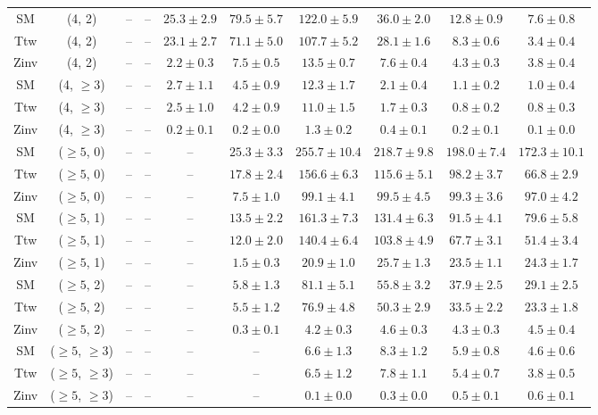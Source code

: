 \begin{table}[h!]
{\begin{tabular}{cccccccccc}
	SM & (4, 2) & -- & -- & $25.3\pm 2.9$ & $79.5\pm 5.7$ & $122.0\pm 5.9$ & $36.0\pm 2.0$ & $12.8\pm 0.9$ & $7.6\pm 0.8$ \\[0.5ex] 
	Ttw & (4, 2) & -- & -- & $23.1\pm 2.7$ & $71.1\pm 5.0$ & $107.7\pm 5.2$ & $28.1\pm 1.6$ & $8.3\pm 0.6$ & $3.4\pm 0.4$ \\[0.5ex] 
	Zinv & (4, 2) & -- & -- & $2.2\pm 0.3$ & $7.5\pm 0.5$ & $13.5\pm 0.7$ & $7.6\pm 0.4$ & $4.3\pm 0.3$ & $3.8\pm 0.4$ \\[0.5ex] 
	SM & (4, $\ge3$) & -- & -- & $2.7\pm 1.1$ & $4.5\pm 0.9$ & $12.3\pm 1.7$ & $2.1\pm 0.4$ & $1.1\pm 0.2$ & $1.0\pm 0.4$ \\[0.5ex] 
	Ttw & (4, $\ge3$) & -- & -- & $2.5\pm 1.0$ & $4.2\pm 0.9$ & $11.0\pm 1.5$ & $1.7\pm 0.3$ & $0.8\pm 0.2$ & $0.8\pm 0.3$ \\[0.5ex] 
	Zinv & (4, $\ge3$) & -- & -- & $0.2\pm 0.1$ & $0.2\pm 0.0$ & $1.3\pm 0.2$ & $0.4\pm 0.1$ & $0.2\pm 0.1$ & $0.1\pm 0.0$ \\[0.5ex] 
	SM & ($\ge5$, 0) & -- & -- & -- & $25.3\pm 3.3$ & $255.7\pm 10.4$ & $218.7\pm 9.8$ & $198.0\pm 7.4$ & $172.3\pm 10.1$ \\[0.5ex] 
	Ttw & ($\ge5$, 0) & -- & -- & -- & $17.8\pm 2.4$ & $156.6\pm 6.3$ & $115.6\pm 5.1$ & $98.2\pm 3.7$ & $66.8\pm 2.9$ \\[0.5ex] 
	Zinv & ($\ge5$, 0) & -- & -- & -- & $7.5\pm 1.0$ & $99.1\pm 4.1$ & $99.5\pm 4.5$ & $99.3\pm 3.6$ & $97.0\pm 4.2$ \\[0.5ex] 
	SM & ($\ge5$, 1) & -- & -- & -- & $13.5\pm 2.2$ & $161.3\pm 7.3$ & $131.4\pm 6.3$ & $91.5\pm 4.1$ & $79.6\pm 5.8$ \\[0.5ex] 
	Ttw & ($\ge5$, 1) & -- & -- & -- & $12.0\pm 2.0$ & $140.4\pm 6.4$ & $103.8\pm 4.9$ & $67.7\pm 3.1$ & $51.4\pm 3.4$ \\[0.5ex] 
	Zinv & ($\ge5$, 1) & -- & -- & -- & $1.5\pm 0.3$ & $20.9\pm 1.0$ & $25.7\pm 1.3$ & $23.5\pm 1.1$ & $24.3\pm 1.7$ \\[0.5ex] 
	SM & ($\ge5$, 2) & -- & -- & -- & $5.8\pm 1.3$ & $81.1\pm 5.1$ & $55.8\pm 3.2$ & $37.9\pm 2.5$ & $29.1\pm 2.5$ \\[0.5ex] 
	Ttw & ($\ge5$, 2) & -- & -- & -- & $5.5\pm 1.2$ & $76.9\pm 4.8$ & $50.3\pm 2.9$ & $33.5\pm 2.2$ & $23.3\pm 1.8$ \\[0.5ex] 
	Zinv & ($\ge5$, 2) & -- & -- & -- & $0.3\pm 0.1$ & $4.2\pm 0.3$ & $4.6\pm 0.3$ & $4.3\pm 0.3$ & $4.5\pm 0.4$ \\[0.5ex] 
	SM & ($\ge5$, $\ge3$) & -- & -- & -- & -- & $6.6\pm 1.3$ & $8.3\pm 1.2$ & $5.9\pm 0.8$ & $4.6\pm 0.6$ \\[0.5ex] 
	Ttw & ($\ge5$, $\ge3$) & -- & -- & -- & -- & $6.5\pm 1.2$ & $7.8\pm 1.1$ & $5.4\pm 0.7$ & $3.8\pm 0.5$ \\[0.5ex] 
	Zinv & ($\ge5$, $\ge3$) & -- & -- & -- & -- & $0.1\pm 0.0$ & $0.3\pm 0.0$ & $0.5\pm 0.1$ & $0.6\pm 0.1$ \\[0.5ex] 
	\hline
	\hline
\end{tabular}}
\end{table}
